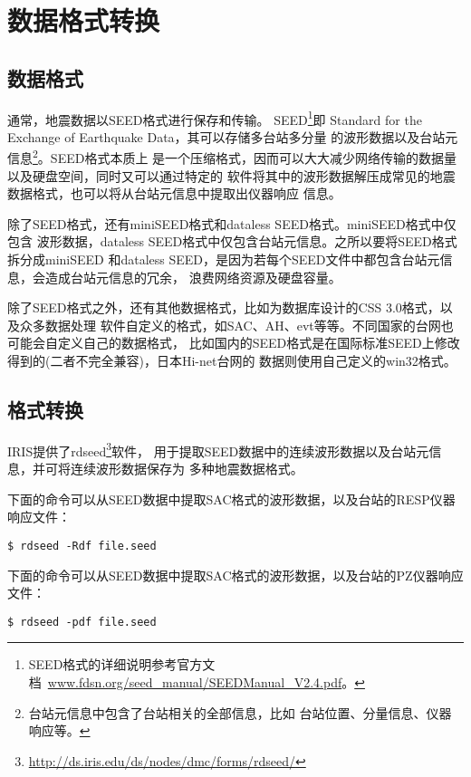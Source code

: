 \section{数据格式转换}
\subsection{数据格式}
通常，地震数据以SEED格式进行保存和传输。
SEED\footnote{SEED格式的详细说明参考官方文档~\url{www.fdsn.org/seed_manual/SEEDManual_V2.4.pdf}。}即
Standard for the Exchange of Earthquake Data，其可以存储多台站多分量
的波形数据以及台站元信息\footnote{台站元信息中包含了台站相关的全部信息，比如
台站位置、分量信息、仪器响应等。}。SEED格式本质上
是一个压缩格式，因而可以大大减少网络传输的数据量以及硬盘空间，同时又可以通过特定的
软件将其中的波形数据解压成常见的地震数据格式，也可以将从台站元信息中提取出仪器响应
信息。

除了SEED格式，还有miniSEED格式和dataless SEED格式。miniSEED格式中仅包含
波形数据，dataless SEED格式中仅包含台站元信息。之所以要将SEED格式拆分成miniSEED
和dataless SEED，是因为若每个SEED文件中都包含台站元信息，会造成台站元信息的冗余，
浪费网络资源及硬盘容量。

除了SEED格式之外，还有其他数据格式，比如为数据库设计的CSS 3.0格式，以及众多数据处理
软件自定义的格式，如SAC、AH、evt等等。不同国家的台网也可能会自定义自己的数据格式，
比如国内的SEED格式是在国际标准SEED上修改得到的(二者不完全兼容)，日本Hi-net台网的
数据则使用自己定义的win32格式。

\subsection{格式转换}
IRIS提供了rdseed\footnote{\url{http://ds.iris.edu/ds/nodes/dmc/forms/rdseed/}}软件，
用于提取SEED数据中的连续波形数据以及台站元信息，并可将连续波形数据保存为
多种地震数据格式。

下面的命令可以从SEED数据中提取SAC格式的波形数据，以及台站的RESP仪器响应文件：
\begin{verbatim}
$ rdseed -Rdf file.seed
\end{verbatim}

下面的命令可以从SEED数据中提取SAC格式的波形数据，以及台站的PZ仪器响应文件：
\begin{verbatim}
$ rdseed -pdf file.seed
\end{verbatim}
